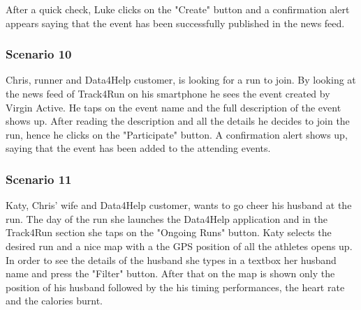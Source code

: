 After a quick check, Luke clicks on the "Create" button and a confirmation alert appears saying that the event has been successfully published in the news feed.
\subsubsection{Scenario 10}
Chris, runner and Data4Help customer, is looking for a run to join. By looking at the  news feed of Track4Run on his smartphone he sees the event created by Virgin Active. He taps on the event name and the full description of the event shows up. After reading the description and all the details he decides to join the run, hence he clicks on the "Participate" button. A confirmation alert shows up, saying that the event has been added to the attending events.
\subsubsection{Scenario 11}
Katy, Chris' wife and Data4Help customer,  wants to go cheer his husband at the run. The day of the run she launches the Data4Help application and in the Track4Run section she taps on the "Ongoing Runs" button. Katy selects the desired run and a nice map with a the GPS position of all the athletes opens up. In order to see the details of the husband she types in a textbox her husband name and press the "Filter" button. After that on the map is shown only the position of his husband followed by the his timing performances, the heart rate and the calories burnt. 

